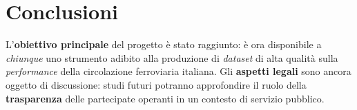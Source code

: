 \documentclass[italian]{article}
\begin{document}
\section{Conclusioni}

L'\textbf{obiettivo principale} del progetto è stato raggiunto: è ora
disponibile a \textit{chiunque} uno strumento adibito alla produzione
di \textit{dataset} di alta qualità sulla \textit{performance} della
circolazione ferroviaria italiana.  Gli \textbf{aspetti legali} sono
ancora oggetto di discussione: studi futuri potranno approfondire il
ruolo della \textbf{trasparenza} delle partecipate operanti in un
contesto di servizio pubblico.
\end{document}
